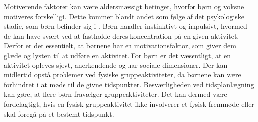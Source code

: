 Motiverende faktorer kan være aldersmæssigt betinget, hvorfor børn og voksne motiveres forskelligt. Dette kommer blandt andet som følge af det psykologiske stadie, som børn befinder sig i \citep{V.Brown2007}. Børn handler instinktivt og impulsivt, hvormed de kan have svært ved at fastholde deres koncentration på en given aktivitet. Derfor er det essentielt, at børnene har en motivationsfaktor, som giver dem glæde og lysten til at udføre en aktivitet. \citep{V.Brown2007} \newline
For børn er det væsentligt, at en aktivitet opleves sjovt, anerkendende og har sociale dimensioner. Der kan midlertid opstå problemer ved fysiske gruppeaktiviteter, da børnene kan være forhindret i at møde til de givne tidspunkter. Besværligheden ved tidsplanlægning kan gøre, at flere børn fravælger gruppeaktiviteter. %
Det kan dermed være fordelagtigt, hvis en fysisk gruppeaktivitet ikke involverer et fysisk fremmøde eller skal foregå på et bestemt tidspunkt. %
\citep{Wied2011,Romani2013} %

